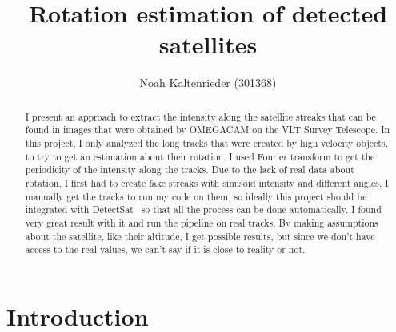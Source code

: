 \documentclass[a4paper,12pt,oneside]{report}
\title{Rotation estimation of detected satellites}
\author{Noah Kaltenrieder (301368)}
\begin{document}
\maketitle
{}
\makeacks

\begin{abstract}
I present an approach to extract the intensity along the satellite streaks that can be found in images that were obtained by OMEGACAM 
on the VLT Survey Telescope. In this project, I only analyzed the long tracks that were created by high velocity objects, to
try to get an estimation about their rotation. I used Fourier transform to get the periodicity of the intensity along the tracks.
Due to the lack of real data about rotation, I first had to create fake streaks with sinusoid intensity and different angles.
I manually get the tracks to run my code on them, so ideally this project should be integrated with DetectSat~\cite{detectsatRepository} so that all 
the process can be done automatically. I found very great result with it and run the pipeline on real tracks. By making assumptions about the satellite, 
like their altitude, I get possible results, but since we don't have access to the real values, we can't say if it is close to reality or not.
\end{abstract}


\maketoc

\chapter{Introduction}
\end{document}
